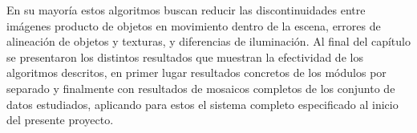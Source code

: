 En su mayoría estos algoritmos buscan reducir las discontinuidades entre imágenes producto de objetos en movimiento dentro de la escena, errores de alineación de objetos y texturas, y diferencias de iluminación. Al final del capítulo se presentaron los distintos resultados que muestran la efectividad de los algoritmos descritos, en primer lugar resultados concretos de los módulos por separado y finalmente con resultados de mosaicos completos de los conjunto de datos estudiados, aplicando para estos el sistema completo especificado al inicio del presente proyecto.

